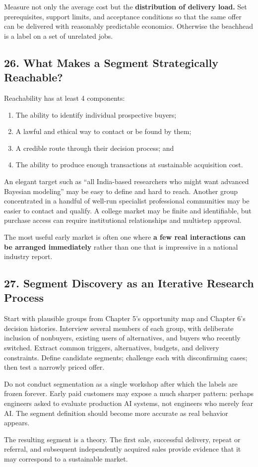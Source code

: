 Measure not only the average cost but the \textbf{distribution of delivery load.} Set prerequisites, support limits, and acceptance conditions so that the same offer can be delivered with reasonably predictable economics. Otherwise the beachhead is a label on a set of unrelated jobs.

\subsection*{26. What Makes a Segment Strategically Reachable?}

Reachability has at least 4 components:

\begin{enumerate}
    \item The ability to identify individual prospective buyers;
    \item A lawful and ethical way to contact or be found by them;
    \item A credible route through their decision process; and
    \item The ability to produce enough transactions at sustainable acquisition cost.
\end{enumerate}

An elegant target such as ``all India-based researchers who might want advanced Bayesian modeling'' may be easy to define and hard to reach. Another group concentrated in a handful of well-run specialist professional communities may be easier to contact and qualify. A college market may be finite and identifiable, but purchase access can require institutional relationships and multistep approval.

The most useful early market is often one where \textbf{a few real interactions can be arranged immediately} rather than one that is impressive in a national industry report.

\subsection*{27. Segment Discovery as an Iterative Research Process}

Start with plausible groups from Chapter 5's opportunity map and Chapter 6's decision histories. Interview several members of each group, with deliberate inclusion of nonbuyers, existing users of alternatives, and buyers who recently switched. Extract common triggers, alternatives, budgets, and delivery constraints. Define candidate segments; challenge each with disconfirming cases; then test a narrowly priced offer.

Do not conduct segmentation as a single workshop after which the labels are frozen forever. Early paid customers may expose a much sharper pattern: perhaps engineers asked to evaluate production AI systems, not engineers who merely fear AI. The segment definition should become more accurate as real behavior appears.

The resulting segment is a theory. The first sale, successful delivery, repeat or referral, and subsequent independently acquired sales provide evidence that it may correspond to a sustainable market.
